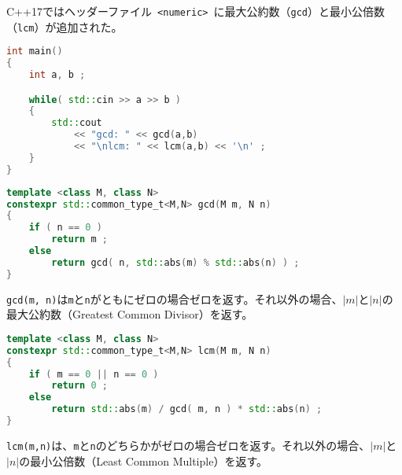 %

C++17ではヘッダーファイル~\lstinline!<numeric>!~に最大公約数（\lstinline!gcd!）と最小公倍数（\lstinline!lcm!）が追加された。

\begin{lstlisting}[language=C++]
int main()
{
    int a, b ;

    while( std::cin >> a >> b )
    {
        std::cout
            << "gcd: " << gcd(a,b)
            << "\nlcm: " << lcm(a,b) << '\n' ;
    }
}
\end{lstlisting}

%

\bgroup
\begin{lstlisting}[language=C++]
template <class M, class N>
constexpr std::common_type_t<M,N> gcd(M m, N n)
{
    if ( n == 0 )
        return m ;
    else
        return gcd( n, std::abs(m) % std::abs(n) ) ; 
}
\end{lstlisting}
\egroup

\lstinline!gcd(m, n)!は\lstinline!m!と\lstinline!n!がともにゼロの場合ゼロを返す。それ以外の場合、\(|m|\)と\(|n|\)の最大公約数（Greatest
Common Divisor）を返す。

%

\bgroup
\begin{lstlisting}[language=C++]
template <class M, class N>
constexpr std::common_type_t<M,N> lcm(M m, N n)
{
    if ( m == 0 || n == 0 )
        return 0 ;
    else
        return std::abs(m) / gcd( m, n ) * std::abs(n) ;
}
\end{lstlisting}
\egroup

\lstinline!lcm(m,n)!は、\lstinline!m!と\lstinline!n!のどちらかがゼロの場合ゼロを返す。それ以外の場合、\(|m|\)と\(|n|\)の最小公倍数（Least
Common Multiple）を返す。
